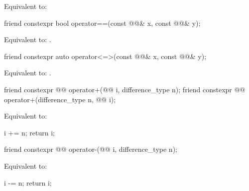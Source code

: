 \begin{itemdescr}
\pnum
\effects
Equivalent to: 
\end{itemdescr}

%
\begin{itemdecl}
friend constexpr bool operator==(const @@& x, const @@& y);
\end{itemdecl}

\begin{itemdescr}
\pnum
\effects
Equivalent to: .
\end{itemdescr}

%
\begin{itemdecl}
friend constexpr auto operator<=>(const @@& x, const @@& y);
\end{itemdecl}

\begin{itemdescr}
\pnum
\effects
Equivalent to: .
\end{itemdescr}

%
\begin{itemdecl}
friend constexpr @@ operator+(@@ i, difference_type n);
friend constexpr @@ operator+(difference_type n, @@ i);
\end{itemdecl}

\begin{itemdescr}
\pnum
\effects
Equivalent to:
\begin{codeblock}
i += n;
return i;
\end{codeblock}
\end{itemdescr}

%
\begin{itemdecl}
friend constexpr @@ operator-(@@ i, difference_type n);
\end{itemdecl}

\begin{itemdescr}
\pnum
\effects
Equivalent to:
\begin{codeblock}
i -= n;
return i;
\end{codeblock}
\end{itemdescr}

